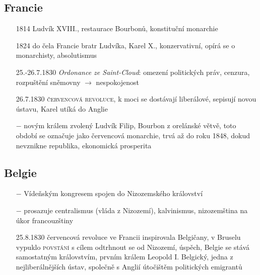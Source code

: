 \documentclass{article}
\begin{document}
\subsection*{Francie}
\begin{itemize}
    \vspace{-0.5em}
    \setlength\itemsep{0.15em}
    \item[1814] Ludvík XVIII., restaurace Bourbonů, konstituční monarchie
    \item[1824] do čela Francie bratr Ludvíka, Karel X., konzervativní, opírá se o monarchisty, absolutismus
    \item[25.-26.7.1830] \textit{Ordonance ze Saint-Cloud}: omezení politických práv, cenzura,  rozpuštění sněmovny $\rightarrow$ nespokojenost
    \item[26.7.1830] \textsc{červencová revoluce}, k moci se dostávají liberálové, sepisují novou ústavu, Karel utíká do Anglie
    \item[$-$] novým králem zvolený Ludvík Filip, Bourbon z orelánské větvě, toto období se označuje jako červencová monarchie, trvá až do roku 1848, dokud nevznikne republika, ekonomická prosperita
\end{itemize}

\subsection*{Belgie}
\begin{itemize}
    \vspace{-0.5em}
    \setlength\itemsep{0.15em}
    \item[$-$] Vídeňským kongresem spojen do Nizozemského království
    \item[$-$] prosazuje centralismus (vláda z Nizozemí), kalvinismus, nizozemština na úkor francouzštiny
    \item[25.8.1830] červencová revoluce ve Francii inspirovala Belgičany, v Bruselu vypuklo \textsc{povstání} s cílem odtrhnout se od Nizozemí, úspěch, Belgie se stává samostatným královstvím, prvním králem Leopold I. Belgický, jedna z nejliberálnějších ústav, společně s Anglií útočištěm politických emigrantů
\end{itemize}
\end{document}
